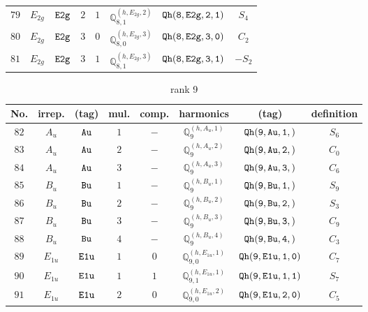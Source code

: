 \documentclass[fleqn,8pt]{jsarticle}
\begin{document}
\begin{table}[ht!]
\begin{center}
\begin{tabular}{cccccccc}
$ 79 $ & $ E_{2g} $ & $ {\tt E2g} $ & $ 2 $ & $ 1 $ & $ \mathbb{Q}_{8,1}^{(h,E_{2g},2)} $ & $ {\tt Qh(8,E2g,2,1)} $ & $ S_{4} $ \\
$ 80 $ & $ E_{2g} $ & $ {\tt E2g} $ & $ 3 $ & $ 0 $ & $ \mathbb{Q}_{8,0}^{(h,E_{2g},3)} $ & $ {\tt Qh(8,E2g,3,0)} $ & $ C_{2} $ \\
$ 81 $ & $ E_{2g} $ & $ {\tt E2g} $ & $ 3 $ & $ 1 $ & $ \mathbb{Q}_{8,1}^{(h,E_{2g},3)} $ & $ {\tt Qh(8,E2g,3,1)} $ & $ - S_{2} $ \\
 \hline \hline
\end{tabular}
\end{center}
\end{table}
\begin{table}[ht!]
\begin{center}
\caption{rank 9}
\renewcommand{\arraystretch}{1.3}
\begin{tabular}{cccccccc} \hline \hline
No. & irrep. & (tag) & mul. & comp. & harmonics & (tag) & definition \\ \hline
$ 82 $ & $ A_{u} $ & $ {\tt Au} $ & $ 1 $ & $ - $ & $ \mathbb{Q}_{9}^{(h,A_{u},1)} $ & $ {\tt Qh(9,Au,1,)} $ & $ S_{6} $ \\
$ 83 $ & $ A_{u} $ & $ {\tt Au} $ & $ 2 $ & $ - $ & $ \mathbb{Q}_{9}^{(h,A_{u},2)} $ & $ {\tt Qh(9,Au,2,)} $ & $ C_{0} $ \\
$ 84 $ & $ A_{u} $ & $ {\tt Au} $ & $ 3 $ & $ - $ & $ \mathbb{Q}_{9}^{(h,A_{u},3)} $ & $ {\tt Qh(9,Au,3,)} $ & $ C_{6} $ \\
$ 85 $ & $ B_{u} $ & $ {\tt Bu} $ & $ 1 $ & $ - $ & $ \mathbb{Q}_{9}^{(h,B_{u},1)} $ & $ {\tt Qh(9,Bu,1,)} $ & $ S_{9} $ \\
$ 86 $ & $ B_{u} $ & $ {\tt Bu} $ & $ 2 $ & $ - $ & $ \mathbb{Q}_{9}^{(h,B_{u},2)} $ & $ {\tt Qh(9,Bu,2,)} $ & $ S_{3} $ \\
$ 87 $ & $ B_{u} $ & $ {\tt Bu} $ & $ 3 $ & $ - $ & $ \mathbb{Q}_{9}^{(h,B_{u},3)} $ & $ {\tt Qh(9,Bu,3,)} $ & $ C_{9} $ \\
$ 88 $ & $ B_{u} $ & $ {\tt Bu} $ & $ 4 $ & $ - $ & $ \mathbb{Q}_{9}^{(h,B_{u},4)} $ & $ {\tt Qh(9,Bu,4,)} $ & $ C_{3} $ \\
$ 89 $ & $ E_{1u} $ & $ {\tt E1u} $ & $ 1 $ & $ 0 $ & $ \mathbb{Q}_{9,0}^{(h,E_{1u},1)} $ & $ {\tt Qh(9,E1u,1,0)} $ & $ C_{7} $ \\
$ 90 $ & $ E_{1u} $ & $ {\tt E1u} $ & $ 1 $ & $ 1 $ & $ \mathbb{Q}_{9,1}^{(h,E_{1u},1)} $ & $ {\tt Qh(9,E1u,1,1)} $ & $ S_{7} $ \\
$ 91 $ & $ E_{1u} $ & $ {\tt E1u} $ & $ 2 $ & $ 0 $ & $ \mathbb{Q}_{9,0}^{(h,E_{1u},2)} $ & $ {\tt Qh(9,E1u,2,0)} $ & $ C_{5} $ \\

\end{tabular}
\end{center}
\end{table}
\end{document}

